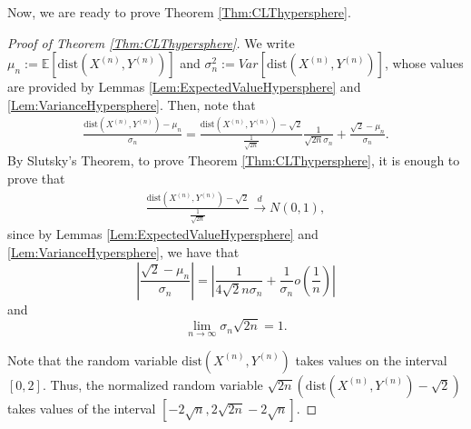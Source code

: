 \documentclass[10pt]{amsart}
\def\dist{\text{dist}}
\numberwithin{equation}{section}
\begin{document}
Now, we are ready to prove Theorem \ref{Thm:CLThypersphere}.
\begin{proof}[Proof of Theorem \ref{Thm:CLThypersphere}]
We write $\mu _n := \mathbb{E} [\dist(X^{(n)},Y^{(n)})]$ and $\sigma^2 _n := Var[\dist(X^{(n)},Y^{(n)})]$, whose values are provided by Lemmas \ref{Lem:ExpectedValueHypersphere} and \ref{Lem:VarianceHypersphere}. Then, note that
\begin{align*}
\frac{ \dist(X^{(n)},Y^{(n)}) -\mu _n}{ \sigma _n } = \frac{\dist(X^{(n)},Y^{(n)}) - \sqrt{2}}{\frac{1}{\sqrt{2n}}} \frac{1}{\sqrt{2n} \sigma _n} + \frac{\sqrt{2} - \mu_n}{\sigma _n}.
\end{align*}
By Slutsky's Theorem, to prove Theorem \ref{Thm:CLThypersphere}, it is enough to prove that
\begin{align*}
\frac{\dist(X^{(n)},Y^{(n)}) - \sqrt{2}}{\frac{1}{\sqrt{2n}}} \overset{d}{ \to } N(0,1),
\end{align*}
since by Lemmas \ref{Lem:ExpectedValueHypersphere} and \ref{Lem:VarianceHypersphere},
we have that $$ \left| \frac{\sqrt{2} - \mu _n}{\sigma_n} \right|  = \left| \frac{1}{4\sqrt{2}n \sigma _n} + \frac{1}{\sigma _n} o \left( \frac{1}{n} \right) \right| $$
and 
$$\lim _{n \to \infty} \sigma _n \sqrt{2n} = 1.$$

Note that the random variable $\dist(X^{(n)},Y^{(n)})$ takes values on the interval $[0,2]$. Thus, the normalized random variable $\sqrt{2n} \left( \dist(X^{(n)},Y^{(n)}) - \sqrt{2} \right) $ takes values of the interval $[-2\sqrt{n},2\sqrt{2n} -2\sqrt{n}  ]$.


\end{proof}
\end{document}
